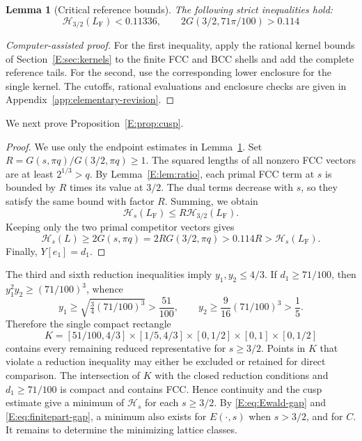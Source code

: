 \documentclass[reqno,english]{amsart}
\newtheorem{lemma}[theorem]{Lemma}
\theoremstyle{definition}
\newtheorem{open problem}[theorem]{Open Problem}
\theoremstyle{remark}
\theoremstyle{plain}
\numberwithin{equation}{section}
\newcommand{\FCC}{L_{\mathrm F}}
\newcommand{\HH}{\mathcal H}
\begin{document}
\begin{lemma}[Critical reference bounds]\label{E:lem:cusp-inputs}
The following strict inequalities hold:
\begin{equation}
 \HH_{3/2}(\FCC)<0.11336,
 \qquad 2G(3/2,71\pi/100)>0.114
 \label{E:eq:cusp-values}
\end{equation}
\end{lemma}
\begin{proof}[Computer-assisted proof]
For the first inequality, apply the rational kernel bounds of
Section~\ref{E:sec:kernels} to the finite FCC and BCC shells and add
the complete reference tails. For the second, use the corresponding
lower enclosure for the single kernel. The cutoffs, rational
evaluations and enclosure checks are given in
Appendix~\ref{app:elementary-revision}.
\end{proof}


We next prove Proposition~\ref{E:prop:cusp}.

\begin{proof}
We use only the endpoint estimates in Lemma~\ref{E:lem:cusp-inputs}.
Set $R=G(s,\pi q)/G(3/2,\pi q)\ge1$. The squared lengths of all
nonzero FCC vectors are at least $2^{1/3}>q$. By
Lemma~\ref{E:lem:ratio}, each primal FCC term at $s$ is bounded by
$R$ times its value at $3/2$. The dual terms decrease with $s$, so
they satisfy the same bound with factor $R$. Summing, we obtain
\[
 \HH_s(\FCC)\le R\HH_{3/2}(\FCC).
\]
Keeping only the two primal competitor vectors gives
\[
 \HH_s(L)\ge2G(s,\pi q)=2R G(3/2,\pi q)>0.114R>\HH_s(\FCC).
\]
Finally, $Y[e_1]=d_1$.
\end{proof}

The third and sixth reduction inequalities imply $y_1,y_2\le4/3$. If $d_1\ge71/100$, then $y_1^2y_2\ge(71/100)^3$, whence
\[
 y_1\ge\sqrt{\tfrac34(71/100)^3}>\frac{51}{100},
 \qquad y_2\ge\frac9{16}(71/100)^3>\frac15.
\]
Therefore the single compact rectangle
\begin{equation}
 K=[51/100,4/3]\times[1/5,4/3]\times[0,1/2]\times[0,1]\times[0,1/2]
 \label{E:eq:root-rectangle}
\end{equation}
contains every remaining reduced representative for $s\ge3/2$.
Points in $K$ that violate a reduction inequality may either be
excluded or retained for direct comparison. The intersection of $K$
with the closed reduction conditions and $d_1\ge71/100$ is compact
and contains FCC. Hence continuity and the cusp estimate give a
minimum of $\HH_s$ for each $s\ge3/2$. By
\eqref{E:eq:Ewald-gap} and \eqref{E:eq:finitepart-gap}, a minimum
also exists for $E(\cdot,s)$ when $s>3/2$, and for $C$.
It remains to determine the minimizing lattice classes.
\end{document}
